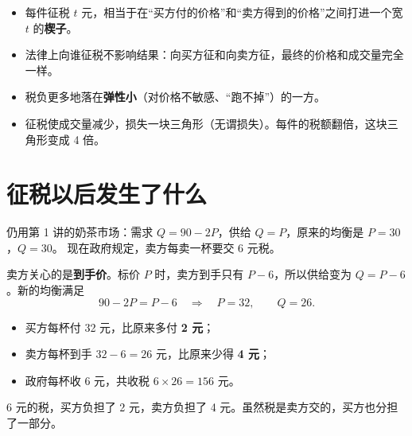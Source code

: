 
\begin{keypoints}
\begin{itemize}
  \item 每件征税 $t$ 元，相当于在“买方付的价格”和“卖方得到的价格”之间打进一个宽 $t$ 的\textbf{楔子}。
  \item 法律上向谁征税不影响结果：向买方征和向卖方征，最终的价格和成交量完全一样。
  \item 税负更多地落在\textbf{弹性小}（对价格不敏感、“跑不掉”）的一方。
  \item 征税使成交量减少，损失一块三角形（无谓损失）。每件的税额翻倍，这块三角形变成 4 倍。
\end{itemize}
\end{keypoints}

\section{征税以后发生了什么}

仍用第 1 讲的奶茶市场：需求 $Q=90-2P$，供给 $Q=P$，原来的均衡是 $P=30$，$Q=30$。
现在政府规定，卖方每卖一杯要交 6 元税。

卖方关心的是\textbf{到手价}。标价 $P$ 时，卖方到手只有 $P-6$，所以供给变为 $Q=P-6$。新的均衡满足
\[
  90-2P=P-6 \quad\Longrightarrow\quad P=32,\qquad Q=26 .
\]
\begin{itemize}
  \item 买方每杯付 32 元，比原来多付 \textbf{2 元}；
  \item 卖方每杯到手 $32-6=26$ 元，比原来少得 \textbf{4 元}；
  \item 政府每杯收 6 元，共收税 $6\times26=156$ 元。
\end{itemize}
6 元的税，买方负担了 2 元，卖方负担了 4 元。虽然税是卖方交的，买方也分担了一部分。

